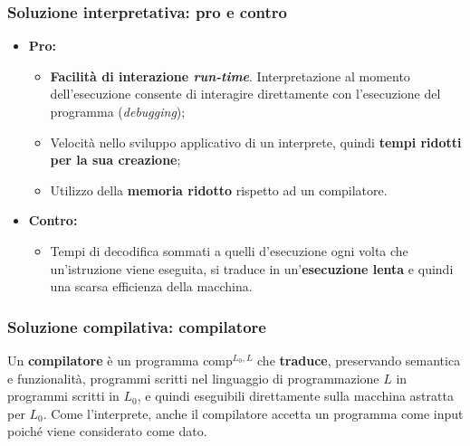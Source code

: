 \documentclass[a4paper]{article}
\begin{document}
	\subsubsection{Soluzione interpretativa: pro e contro}
	
	\begin{itemize}
		\item \textcolor{Green4}{\textbf{Pro:}}
		\begin{itemize}
			\item \textbf{Facilità di interazione \emph{run-time}}. Interpretazione al momento dell'esecuzione consente di interagire direttamente con l'esecuzione del programma (\emph{debugging});
			\item Velocità nello sviluppo applicativo di un interprete, quindi \textbf{tempi ridotti per la sua creazione};
			\item Utilizzo della \textbf{memoria ridotto} rispetto ad un compilatore.
		\end{itemize}

		\item \textcolor{Red3}{\textbf{Contro:}}
		\begin{itemize}
			\item Tempi di decodifica sommati a quelli d'esecuzione ogni volta che un'istruzione viene eseguita, si traduce in un'\textbf{esecuzione lenta} e quindi una scarsa efficienza della macchina.
		\end{itemize}
	\end{itemize}\newpage
	
	\subsubsection{Soluzione compilativa: compilatore}\label{compilatore}

	Un \textcolor{Red3}{\textbf{compilatore}} è un programma $\mathrm{comp}^{L_{0}, L}$ che \textbf{traduce}, preservando semantica e funzionalità, programmi scritti nel linguaggio di programmazione $L$ in programmi scritti in $L_{0}$, e quindi eseguibili direttamente sulla macchina astratta per $L_{0}$.
	Come l'interprete, anche il compilatore accetta un programma come input poiché viene considerato come dato.\newline
	
\end{document}
